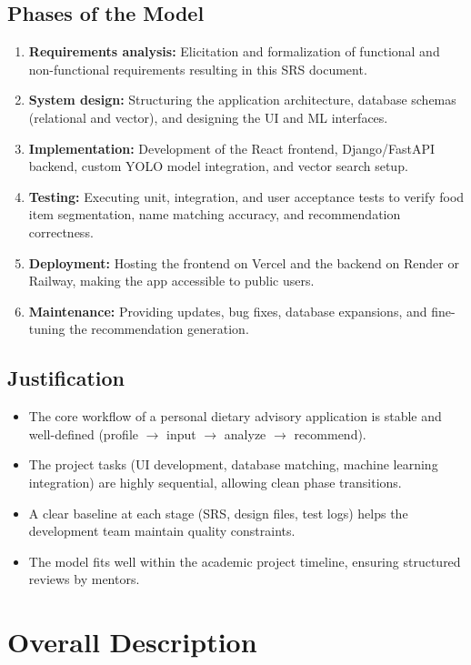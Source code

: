 \documentclass[11pt,a4paper]{article}
\begin{document}
\subsection{Phases of the Model}
\begin{enumerate}[leftmargin=*]
  \item \textbf{Requirements analysis:} Elicitation and formalization of functional and non-functional requirements resulting in this SRS document.
  \item \textbf{System design:} Structuring the application architecture, database schemas (relational and vector), and designing the UI and ML interfaces.
  \item \textbf{Implementation:} Development of the React frontend, Django/FastAPI backend, custom YOLO model integration, and vector search setup.
  \item \textbf{Testing:} Executing unit, integration, and user acceptance tests to verify food item segmentation, name matching accuracy, and recommendation correctness.
  \item \textbf{Deployment:} Hosting the frontend on Vercel and the backend on Render or Railway, making the app accessible to public users.
  \item \textbf{Maintenance:} Providing updates, bug fixes, database expansions, and fine-tuning the recommendation generation.
\end{enumerate}

\subsection{Justification}
\begin{itemize}[leftmargin=*]
  \item The core workflow of a personal dietary advisory application is stable and well-defined (profile $\rightarrow$ input $\rightarrow$ analyze $\rightarrow$ recommend).
  \item The project tasks (UI development, database matching, machine learning integration) are highly sequential, allowing clean phase transitions.
  \item A clear baseline at each stage (SRS, design files, test logs) helps the development team maintain quality constraints.
  \item The model fits well within the academic project timeline, ensuring structured reviews by mentors.
\end{itemize}


\section{Overall Description}
\end{document}
